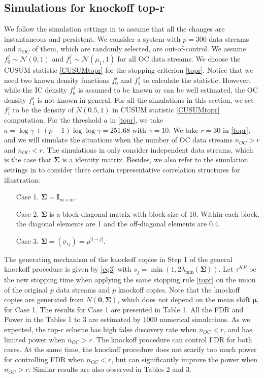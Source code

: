 \documentclass[a4paper,12pt]{article}
\providecommand{\tightlist}{%
  \setlength{\itemsep}{0pt}\setlength{\parskip}{0pt}}
\begin{document}
\subsection{Simulations for knockoff top-r}

We follow the simulation settings in \cite{mei2011quickest} to assume that all the changes are instantaneous and persistent. We consider a system with $p=300$ data streams and $n_{OC}$ of them, which are randomly selected, are out-of-control. We assume $f_0^j \sim \mathcal{N}(0,1)$ and $f_1^j \sim \mathcal{N}(\mu_1,1)$ for all OC data streams. We choose the CUSUM statistic \eqref{CUSUMtopr} for the stopping criterion \eqref{topr}. Notice that we need two known density functions $f_0^j$ and $f_1^j$ to calculate the statistic. However, while the IC density $f_0^j$ is assumed to be known or can be well estimated, the OC density $f_1^j$ is not known in general. For all the simulations in this section, we set $f_1^j$ to be the density of $N(0.5,1)$ in CUSUM statistic \eqref{CUSUMtopr} computation. For the threshold $a$ in \eqref{topr}, we take $a = \log\gamma + (p-1)\log\log\gamma=251.68$ with $\gamma=10$. We take $r=30$ in \eqref{topr}, and we will simulate the situations when the number of OC data streams $n_{OC}>r$ and $n_{OC}<r$. The simulations in \cite{mei2011quickest} only consider independent data streams, which is the case that $\bm \Sigma$ is a identity matrix. Besides, we also refer to the simulation settings in \cite{li2020diagnostic} to consider three certain representative correlation structures for illustration:
\begin{enumerate}
\tightlist
  \def\labelenumii{\alph{enumii}.}
\item[Case 1.]  $\bm \Sigma=\bm I_{m\times m}$. 
\item[Case 2.]  $\bm \Sigma$ is a block-diagonal matrix with block size of 10. Within each block, the diagonal elements are 1 and the off-diagonal elements are 0.4.
\item[Case 3.]   $\bm \Sigma = (\sigma_{ij}) = \rho^{|i-j|}$.
\end{enumerate}
The generating mechanism of the knockoff copies in Step 1 of the general knockoff procedure is given by \eqref{eq3} with $s_j = \min \left(1, 2 \lambda_{\min}(\bm \Sigma)\right)$. Let $\tau^{KF}$ be the new stopping time when applying the same stopping rule \eqref{topr} on the union of the original $p$ data streams and $p$ knockoff copies. Note that the knockoff copies are generated from $N(\mathbf{0},\bm \Sigma)$, which does not depend on the mean shift $\bm\mu$, for Case 1. The results for Case 1 are presented in Table 1. All the FDR and Power in the Tables 1 to 3 are estimated by $1000$ numerical simulations. As we expected, the top-$r$ scheme has high false discovery rate when $n_{OC}<r$, and has limited power when $n_{OC}>r$. The knockoff procedure can control FDR for both cases. At the same time, the knockoff procedure does not scarify too much power for controlling FDR when $n_{OC}<r$, but can significantly improve the power when $n_{OC}>r$. Similar results are also observed in Tables 2 and 3.
\end{document}
